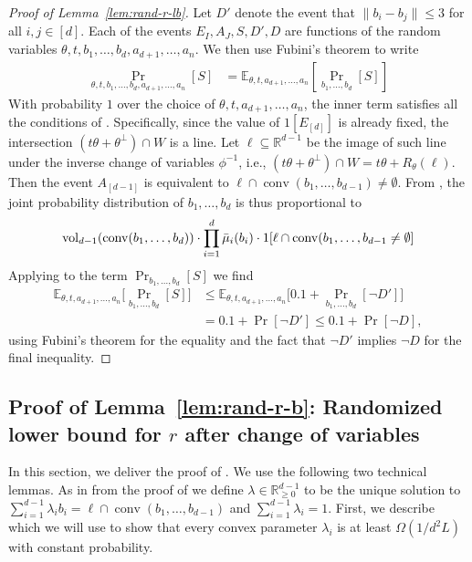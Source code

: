 \documentclass{theoretics}
\newcommand{\R}{\mathbb R}
\newcommand{\E}{\mathbb E}
\newcommand{\conv}{\operatorname{conv}}
\newcommand{\vol}{\operatorname{vol}}
\renewcommand{\subset}{\subseteq}
\begin{document}
\begin{proof}[Proof of Lemma~\ref{lem:rand-r-lb}]
Let $D'$ denote the event that $\|b_i - b_j\| \leq 3$ for all $i,j \in [d]$.
Each of the events $E_I, A_J, S, D', D$ are functions of
the random variables $\theta, t, b_1,\dots,b_d,a_{d+1},\dots,a_n$.
We then use Fubini's theorem to write
\begin{align*}
    \Pr_{\theta,t,b_1,\dots,b_d,a_{d+1},\dots,a_n}[S]
    &= \E_{\theta,t,a_{d+1},\dots,a_n}[\Pr_{b_1,\dots,b_d}[S]]
\end{align*}
With probability $1$ over the choice of $\theta,t,a_{d+1},\dots,a_n$,
the inner term satisfies all the conditions of .
Specifically, since
the value of $1[E_{[d]}]$ is already fixed, the intersection
$(t\theta + \theta^\perp) \cap W$ is a line.
Let $\ell \subset \R^{d-1}$ be the image of such line under the inverse change of variables $\phi^{-1}$, i.e., $(t\theta + \theta^\perp) \cap W = t\theta + R_{\theta}(\ell)$.
Then the event $A_{[d-1]}$ is equivalent to $\ell \cap \conv(b_1,\dots,b_{d-1}) \neq \emptyset$.
From ,
the joint probability distribution of $b_1,\dots,b_d$ is thus proportional to
    \begin{align*}
        \vol_{d-1}(\conv(b_1, \ldots, b_d)) \cdot \prod_{i=1}^d \Bar{\mu}_i(b_i) \cdot 1[\ell \cap \conv(b_1,\dots,b_{d-1} \neq \emptyset]
    \end{align*}
Applying  to the term $\Pr_{b_1,\dots,b_d}[S]$ we find
\begin{align*}
    \E_{\theta,t,a_{d+1},\dots,a_n}\big[\Pr_{b_1,\dots,b_d}[S] \big]
    &\leq \E_{\theta,t,a_{d+1},\dots,a_n}\big[0.1 + \Pr_{b_1,\dots,b_d}[\neg D'] \big]\\
    &= 0.1 + \Pr[\neg D'] \leq 0.1 + \Pr[\neg D],
\end{align*}
using Fubini's theorem for the equality and the fact that $\neg D'$ implies $\neg D$
for the final inequality.
\end{proof}


\subsection{Proof of Lemma~\ref{lem:rand-r-b}: Randomized lower bound for $r$ after change of variables}\label{sec:pf-rand-r-b} 

In this section, we deliver the proof of . We use the following two technical lemmas.
As in from the proof of  we define $\lambda \in \R^{d-1}_{\geq 0}$ to be the unique solution to $\sum_{i=1}^{d-1} \lambda_i b_i = \ell \cap \conv(b_1, \ldots, b_{d-1})$ and $\sum_{i=1}^{d-1} \lambda_i = 1$.
First, we describe  which we will use to show that every convex parameter $\lambda_i$ is at least $\Omega(1/d^2L)$ with constant probability.
\end{document}
